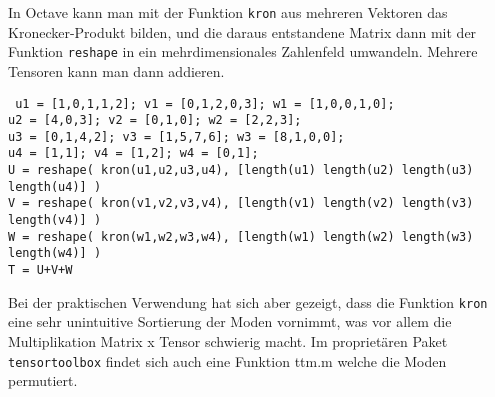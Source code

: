 \documentclass[11pt]{article} %
\begin{document}
\begin{rmk}
\begin{changemargin}{0pt}{0pt}
In Octave kann man mit der Funktion \texttt{kron} aus mehreren Vektoren das Kronecker-Produkt bilden, und die daraus
entstandene Matrix dann mit der Funktion \texttt{reshape} in ein mehrdimensionales Zahlenfeld umwandeln. Mehrere
Tensoren kann man dann addieren.
\end{changemargin}

\begin{changemargin}{15pt}{15pt}
\small\texttt{\noindent
u1 = [1,0,1,1,2]; v1 = [0,1,2,0,3]; w1 = [1,0,0,1,0];\\
u2 = [4,0,3]; v2 = [0,1,0]; w2 = [2,2,3];\\
u3 = [0,1,4,2]; v3 = [1,5,7,6]; w3 = [8,1,0,0];\\
u4 = [1,1]; v4 = [1,2]; w4 = [0,1];\\
U = reshape( kron(u1,u2,u3,u4), [length(u1) length(u2) length(u3) length(u4)] )\\
V = reshape( kron(v1,v2,v3,v4), [length(v1) length(v2) length(v3) length(v4)] )\\
W = reshape( kron(w1,w2,w3,w4), [length(w1) length(w2) length(w3) length(w4)] )\\
T = U+V+W}
\end{changemargin}

Bei der praktischen Verwendung hat sich aber gezeigt, dass die Funktion \texttt{kron} eine sehr
unintuitive Sortierung der Moden vornimmt, was vor allem die Multiplikation Matrix x Tensor schwierig
macht. Im proprietären Paket \texttt{tensortoolbox} \cite{tensortools} findet sich auch eine Funktion
ttm.m welche die Moden permutiert.
\end{rmk}
\end{document}
